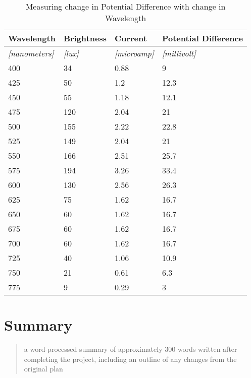 \documentclass{article}
\begin{document}
\begin{table}[!ht]
\centering
\caption{Measuring change in Potential Difference with change in Wavelength}
\label{my-label}
\begin{tabular}{|l|l|l|l|}
\hline
\textbf{Wavelength}       & \textbf{Brightness} & \textbf{Current}        & \textbf{Potential Difference} \\ \hline
\textit{{[}nanometers{]}} & \textit{{[}lux{]}}  & \textit{{[}microamp{]}} & \textit{{[}millivolt{]}}      \\ \hline
400                       & 34                  & 0.88                    & 9                             \\ \hline
425                       & 50                  & 1.2                     & 12.3                          \\ \hline
450                       & 55                  & 1.18                    & 12.1                          \\ \hline
475                       & 120                 & 2.04                    & 21                            \\ \hline
500                       & 155                 & 2.22                    & 22.8                          \\ \hline
525                       & 149                 & 2.04                    & 21                            \\ \hline
550                       & 166                 & 2.51                    & 25.7                          \\ \hline
575                       & 194                 & 3.26                    & 33.4                          \\ \hline
600                       & 130                 & 2.56                    & 26.3                          \\ \hline
625                       & 75                  & 1.62                    & 16.7                          \\ \hline
650                       & 60                  & 1.62                    & 16.7                          \\ \hline
675                       & 60                  & 1.62                    & 16.7                          \\ \hline
700                       & 60                  & 1.62                    & 16.7                          \\ \hline
725                       & 40                  & 1.06                    & 10.9                          \\ \hline
750                       & 21                  & 0.61                    & 6.3                           \\ \hline
775                       & 9                   & 0.29                    & 3                             \\ \hline
\end{tabular}
\end{table}

\section{Summary}
\begin{quote}
  a word-processed summary of approximately 300 words written after completing the project, including an outline of any changes from the original plan
\end{quote}
\end{document}
